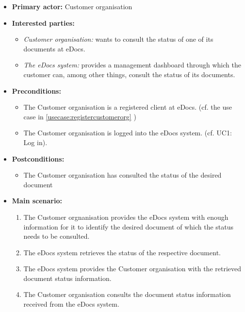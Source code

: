 \documentclass[a4paper,10pt]{article}
\begin{document}
\begin{itemize}
    \item \textbf{Primary actor:} Customer organisation
    \item \textbf{Interested parties:} 
        \begin{itemize}
            \item \textit{Customer organisation:} wants to consult the status of one of its documents at eDocs.
            \item \textit{The eDocs system:} provides a management dashboard through which the customer can, among other things, consult the status of its documents.
        \end{itemize}

    \item \textbf{Preconditions:}
        \begin{itemize}
            \item The Customer organisation is a registered client at eDocs. (cf. the use case in \ref{usecase:registercustomerorg} )
            \item The Customer organisation is logged into the eDocs system. (cf. UC1: Log in).
        \end{itemize}

    \item \textbf{Postconditions:}
        \begin{itemize}
            \item The Customer organisation has consulted the status of the desired document
        \end{itemize}
        
    \item \textbf{Main scenario:} 
    \begin{enumerate}
       \item The Customer orgnanisation provides the eDocs system with enough information for it to identify the desired document of which the status needs to be consulted.
       \item The eDocs system retrieves the status of the respective document.
       \item The eDocs system provides the Customer organisation with the retrieved document status information.
       \item The Customer organisation consults the document status information received from the eDocs system.
    \end{enumerate}
\end{itemize}
\end{document}
